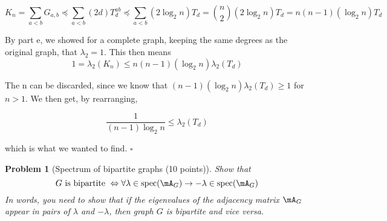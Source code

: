 \documentclass[10pt]{article}
\newcommand{\1}{\vec{\mathbbm{1}}}
\newtheorem{problem}{\sc\color{cit}Problem}
\begin{document}
{\begin{enumerate}[(a)]
\[
K_n = \sum_{a < b}G_{a, b} \preceq \sum_{a < b} (2d)T_d^{ab} \preceq \sum_{a < b} (2\log_2 n)T_d = {n \choose 2}(2\log_2 n)T_d = n(n-1)(\log_2 n)T_d
\]
\end{enumerate}

By part e, we showed for a complete graph, keeping the same degrees as the original graph, that $\lambda_2 = 1$. This then means 
\[
1 = \lambda_2(K_n) \leq n(n-1)(\log_2n)\lambda_2(T_d)
\]

The n can be discarded, since we know that $(n-1)(\log_2n)\lambda_2(T_d)\geq 1$ for $n > 1$. We then get, by rearranging,

\[
\frac{1}{(n-1)\log_2 n} \leq \lambda_2(T_d)
\]

which is what we wanted to find. \hfill $\square$
}
\newpage
\begin{problem}[Spectrum of bipartite graphs (10 points)]
Show that
$$G\text{ is bipartite } \Leftrightarrow \forall \lambda \in \text{spec}(\mA_G) \rightarrow -\lambda \in \text{spec}(\mA_G)$$
In words, you need to show that if the eigenvalues of the adjacency matrix $\mA_G$
appear in pairs of $\lambda$ and $-\lambda$, then graph $G$ is bipartite and vice
versa.
\end{problem}
\end{document}
